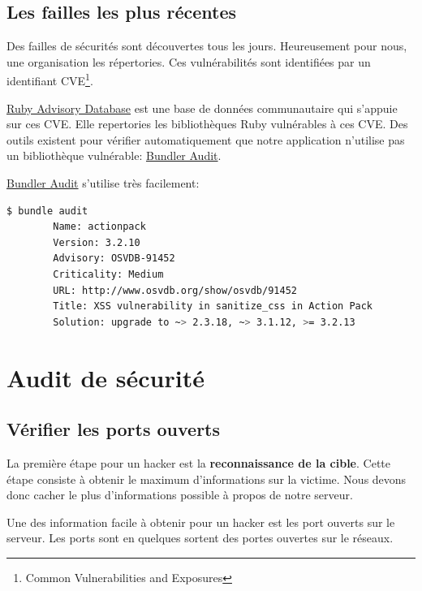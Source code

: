 \documentclass[]{report}
\begin{document}
    \subsection{Les failles les plus récentes}

      Des failles de sécurités sont découvertes tous les jours. Heureusement pour nous, une organisation les répertories. Ces vulnérabilités sont identifiées par un identifiant CVE\footnote{Common Vulnerabilities and Exposures}.

      \href{https://github.com/rubysec/ruby-advisory-db}{Ruby Advisory Database} est une base de données communautaire qui s'appuie sur ces CVE. Elle repertories les bibliothèques Ruby vulnérables à ces CVE. Des outils existent pour vérifier automatiquement que notre application n'utilise pas un bibliothèque vulnérable: \href{https://github.com/rubysec/bundler-audit}{Bundler Audit}.

      \href{https://github.com/rubysec/bundler-audit}{Bundler Audit} s'utilise très facilement:

      \begin{scriptsize}
        \begin{lstlisting}[language=bash]
        $ bundle audit
        Name: actionpack
        Version: 3.2.10
        Advisory: OSVDB-91452
        Criticality: Medium
        URL: http://www.osvdb.org/show/osvdb/91452
        Title: XSS vulnerability in sanitize_css in Action Pack
        Solution: upgrade to ~> 2.3.18, ~> 3.1.12, >= 3.2.13
        \end{lstlisting}
      \end{scriptsize}


  \section{Audit de sécurité}

    \subsection{Vérifier les ports ouverts}

      La première étape pour un hacker est la \textbf{reconnaissance de la cible}. Cette étape consiste à obtenir le maximum d'informations sur la victime. Nous devons donc cacher le plus d'informations possible à propos de notre serveur.

      Une des information facile à obtenir pour un hacker est les port ouverts sur le serveur. Les ports sont en quelques sortent des portes ouvertes sur le réseaux.
\end{document}
